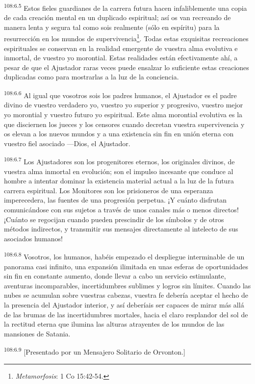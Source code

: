 \par
\textsuperscript{108:6.5} Estos fieles guardianes de la carrera futura hacen infaliblemente una copia de cada creación mental en un duplicado espiritual; así os van recreando de manera lenta y segura tal como sois realmente (sólo en espíritu) para la resurrección en los mundos de supervivencia\footnote{\textit{Metamorfosis}: 1 Co 15:42-54.}. Todas estas exquisitas recreaciones espirituales se conservan en la realidad emergente de vuestra alma evolutiva e inmortal, de vuestro yo morontial. Estas realidades están efectivamente ahí, a pesar de que el Ajustador raras veces puede ensalzar lo suficiente estas creaciones duplicadas como para mostrarlas a la luz de la conciencia.

\par
\textsuperscript{108:6.6} Al igual que vosotros sois los padres humanos, el Ajustador es el padre divino de vuestro verdadero yo, vuestro yo superior y progresivo, vuestro mejor yo morontial y vuestro futuro yo espiritual. Este alma morontial evolutiva es la que disciernen los jueces y los censores cuando decretan vuestra supervivencia y os elevan a los nuevos mundos y a una existencia sin fin en unión eterna con vuestro fiel asociado ---Dios, el Ajustador.

\par
\textsuperscript{108:6.7} Los Ajustadores son los progenitores eternos, los originales divinos, de vuestra alma inmortal en evolución; son el impulso incesante que conduce al hombre a intentar dominar la existencia material actual a la luz de la futura carrera espiritual. Los Monitores son los prisioneros de una esperanza imperecedera, las fuentes de una progresión perpetua. ¡Y cuánto disfrutan comunicándose con sus sujetos a través de unos canales más o menos directos! ¡Cuánto se regocijan cuando pueden prescindir de los símbolos y de otros métodos indirectos, y transmitir sus mensajes directamente al intelecto de sus asociados humanos!

\par
\textsuperscript{108:6.8} Vosotros, los humanos, habéis empezado el despliegue interminable de un panorama casi infinito, una expansión ilimitada en unas esferas de oportunidades sin fin en constante aumento, donde llevar a cabo un servicio estimulante, aventuras incomparables, incertidumbres sublimes y logros sin límites. Cuando las nubes se acumulan sobre vuestras cabezas, vuestra fe debería aceptar el hecho de la presencia del Ajustador interior, y así deberíais ser capaces de mirar más allá de las brumas de las incertidumbres mortales, hacia el claro resplandor del sol de la rectitud eterna que ilumina las alturas atrayentes de los mundos de las mansiones de Satania.

\par
\textsuperscript{108:6.9} [Presentado por un Mensajero Solitario de Orvonton.]